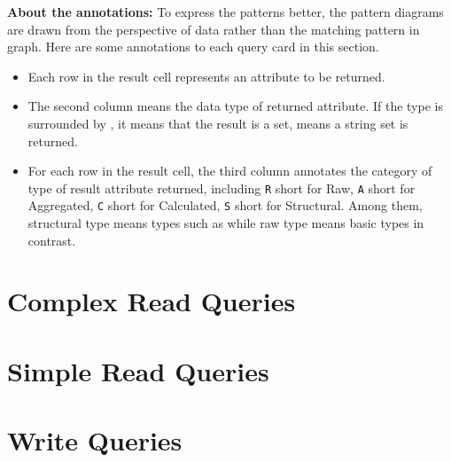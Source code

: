 {\flushleft \textbf{About the annotations:}} To express the patterns better, the
pattern diagrams are drawn from the perspective of data rather than the matching
pattern in graph. Here are some annotations to each query card in this section.
\begin{itemize}
      \item Each row in the result cell represents an attribute to be returned.
      \item The second column means the data type of returned attribute.
      If the type is surrounded by \type{\{\}}, it means that the result is a
      set, \eg {} means a string set is returned.
      \item For each row in the result cell, the third column annotates the
      category of type of result attribute returned, including \texttt{R} short
      for Raw, \texttt{A} short for Aggregated, \texttt{C} short for Calculated,
      \texttt{S} short for Structural. Among them, structural type means types
      such as  while raw type means basic types in contrast.
\end{itemize}


\section{Complex Read Queries}
\label{sec:complex-read-queries}




\section{Simple Read Queries}
\label{sec:simple-read-queries}




\section{Write Queries}
\label{sec:write-queries}

